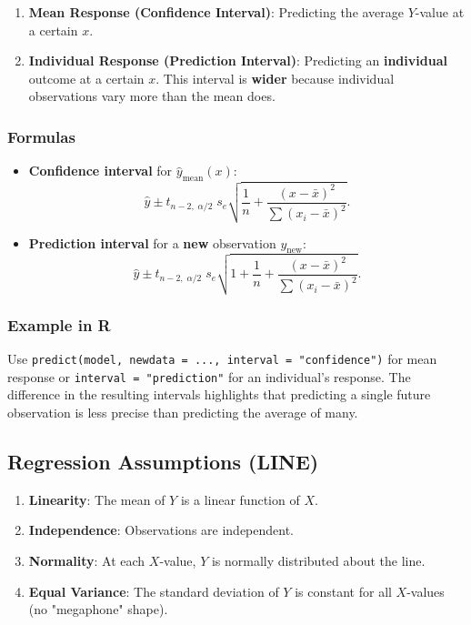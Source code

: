 \documentclass[10pt]{extarticle}
\begin{document}
\begin{enumerate}
    \item \textbf{Mean Response (Confidence Interval)}: Predicting the average $Y$-value at a certain $x$.
    \item \textbf{Individual Response (Prediction Interval)}: Predicting an \textbf{individual} outcome at a certain $x$. This interval is \textbf{wider} because individual observations vary more than the mean does.
\end{enumerate}

\subsubsection{Formulas}

\begin{itemize}
    \item \textbf{Confidence interval} for $\hat{y}_{\text{mean}}(x)$:
          \[
              \hat{y} \pm t_{n-2,\;\alpha/2}\; s_e\sqrt{\frac{1}{n} + \frac{(x - \bar{x})^2}{\sum (x_i - \bar{x})^2}}.
          \]
    \item \textbf{Prediction interval} for a \textbf{new} observation $y_{\text{new}}$:
          \[
              \hat{y} \pm t_{n-2,\;\alpha/2}\; s_e\sqrt{1 + \frac{1}{n} + \frac{(x - \bar{x})^2}{\sum (x_i - \bar{x})^2}}.
          \]
\end{itemize}

\subsubsection{Example in R}

Use \texttt{predict(model, newdata = ..., interval = "confidence")} for mean response or \texttt{interval = "prediction"} for an individual's response. The difference in the resulting intervals highlights that predicting a single future observation is less precise than predicting the average of many.



\subsection{Regression Assumptions (LINE)}

\begin{enumerate}
    \item \textbf{Linearity}: The mean of $Y$ is a linear function of $X$.
    \item \textbf{Independence}: Observations are independent.
    \item \textbf{Normality}: At each $X$-value, $Y$ is normally distributed about the line.
    \item \textbf{Equal Variance}: The standard deviation of $Y$ is constant for all $X$-values (no "megaphone" shape).
\end{enumerate}
\end{document}
